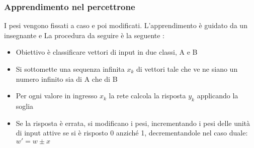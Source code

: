 \subsubsection{Apprendimento nel percettrone}

I pesi vengono fissati a caso e poi modificati. L'apprendimento è guidato da un insegnante e La procedura da seguire è la seguente :
\begin{itemize}
    \item Obiettivo è classificare vettori di input in due classi, A e B
    \item Si sottomette una sequenza infinita {$x_k$} di vettori tale che ve ne siano un numero infinito sia di A che di B 
    \item Per ogni valore in ingresso $x_k$ la rete calcola la risposta $y_k$ applicando la soglia
    \item Se la risposta è errata, si modificano i pesi, incrementando i pesi delle unità di input attive se si è risposto 0 anziché 1, decrementandole nel caso duale: $w'= w \pm x$
\end{itemize}

